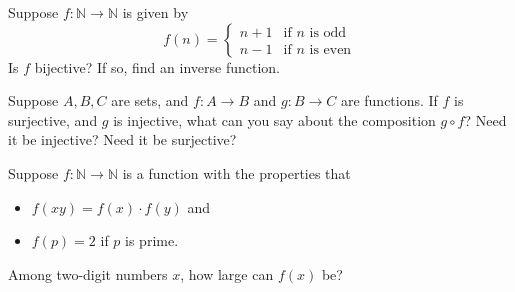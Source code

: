 \documentclass[12pt]{midterm}
\begin{document}
\begin{exam}
\begin{solution}\begin{solutiontext}
\end{solutiontext}\end{solution}

\begin{problem}[350]
Suppose $f : \mathbb{N} \to \mathbb{N}$ is given by
$$
f(n) = \begin{cases}
n+1 & \mbox{if $n$ is odd} \\
n-1 & \mbox{if $n$ is even}
\end{cases}
$$
Is $f$ bijective?  If so, find an inverse function.
\end{problem}

\begin{solution}\begin{solutiontext}
\end{solutiontext}\end{solution}

\begin{problem}[350]
Suppose $A,B,C$ are sets, and $f : A\to B$ and $g : B \to C$ are
functions.  If $f$ is surjective, and $g$ is injective, what can you
say about the composition $g \circ f$?  Need it be injective?  Need it
be surjective?
\end{problem}

\begin{solution}\begin{solutiontext}
\end{solutiontext}\end{solution}

\begin{problem}[350]
Suppose $f : \mathbb{N} \to \mathbb{N}$ is a function with the
properties that
\begin{itemize}
\item $f(xy) = f(x) \cdot f(y)$ and
\item $f(p) = 2$ if $p$ is prime.
\end{itemize}
Among two-digit numbers $x$, how large can $f(x)$ be?
\end{problem}

\begin{solution}\begin{solutiontext}
\end{solutiontext}\end{solution}


\end{exam}
\end{document}
